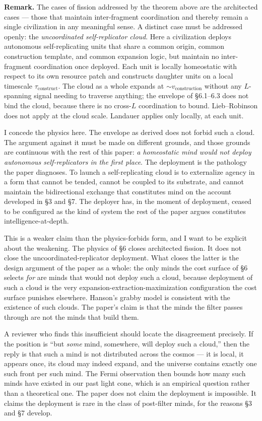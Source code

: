 \documentclass[11pt,twocolumn]{article}
\begin{document}
\textbf{Remark.} The cases of fission addressed by the theorem above are
the architected cases — those that maintain inter-fragment coordination
and thereby remain a single civilization in any meaningful sense. A
distinct case must be addressed openly: the \emph{uncoordinated
self-replicator cloud}. Here a civilization deploys autonomous
self-replicating units that share a common origin, common construction
template, and common expansion logic, but maintain no inter-fragment
coordination once deployed. Each unit is locally homeostatic with
respect to its own resource patch and constructs daughter units on a
local timescale $\tau_{\text{construct}}$. The cloud as a whole expands
at $\sim v_{\text{construction}}$ without any $L$-spanning signal
needing to traverse anything; the envelope of \S 6.1--6.3 does not
bind the cloud, because there is no cross-$L$ coordination to bound.
Lieb--Robinson does not apply at the cloud scale. Landauer applies
only locally, at each unit.

I concede the physics here. The envelope as derived does not forbid
such a cloud. The argument against it must be made on different
grounds, and those grounds are continuous with the rest of this paper:
\emph{a homeostatic mind would not deploy autonomous self-replicators
in the first place}. The deployment is the pathology the paper
diagnoses. To launch a self-replicating cloud is to externalize
agency in a form that cannot be tended, cannot be coupled to its
substrate, and cannot maintain the bidirectional exchange that
constitutes mind on the account developed in \S 3 and \S 7. The
deployer has, in the moment of deployment, ceased to be configured
as the kind of system the rest of the paper argues constitutes
intelligence-at-depth.

This is a weaker claim than the physics-forbids form, and I want to
be explicit about the weakening. The physics of \S 6 closes architected
fission. It does not close the uncoordinated-replicator deployment.
What closes the latter is the design argument of the paper as a whole:
the only minds the cost surface of \S 6 selects \emph{for} are minds
that would not deploy such a cloud, because deployment of such a cloud
is the very expansion-extraction-maximization configuration the cost
surface punishes elsewhere. Hanson's grabby model is consistent with
the existence of such clouds. The paper's claim is that the minds the
filter passes through are not the minds that build them.

A reviewer who finds this insufficient should locate the disagreement
precisely. If the position is ``but \emph{some} mind, somewhere, will
deploy such a cloud,'' then the reply is that such a mind is not
distributed across the cosmos — it is local, it appears once, its
cloud may indeed expand, and the universe contains exactly one such
front per such mind. The Fermi observation then bounds how many such
minds have existed in our past light cone, which is an empirical
question rather than a theoretical one. The paper does not claim the
deployment is impossible. It claims the deployment is rare in the
class of post-filter minds, for the reasons \S 3 and \S 7 develop.
\end{document}
